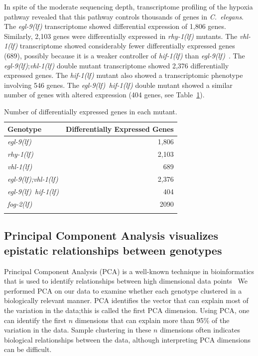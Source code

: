 \documentclass[10pt, onecolumn]{article}
\newcommand{\cel}{\emph{C.~elegans}}
\newcommand{\fog}{\emph{\mbox{fog-2(lf)}}}
\newcommand{\egl}{\emph{\mbox{egl-9}(lf)}}
\newcommand{\rhy}{\emph{\mbox{rhy-1}(lf)}}
\newcommand{\vhl}{\emph{\mbox{vhl-1}(lf)}}
\newcommand{\eglvhl}{\emph{\mbox{egl-9(lf);vhl-1(lf)}}}
\newcommand{\eglhif}{\emph{\mbox{egl-9(lf)}~\mbox{hif-1(lf)}}}
\newcommand{\hif}{\emph{\mbox{hif-1(lf)}}}
\newcommand{\egln}{1,806}
\newcommand{\rhyn}{2,103}
\newcommand{\vhln}{689}
\newcommand{\eglvhln}{2,376}
\newcommand{\hifn}{546}
\newcommand{\eglhifn}{404}
\newcommand{\fogn}{2090}
\begin{document}
In spite of the moderate sequencing depth, transcriptome profiling of the hypoxia
pathway revealed that this pathway controls thousands of genes in \cel{}. The
\egl{} transcriptome showed differential expression of \egln{} genes. Similarly,
\rhyn{} genes were differentially expressed in \rhy{} mutants. The \vhl{}
transcriptome showed considerably fewer differentially expressed genes (\vhln{}),
possibly because it is a weaker controller of \hif{} than
\egl{}~\cite{Shao2009}. The \egl{};\vhl{} double mutant transcriptome showed
\eglvhln{} differentially expressed genes. The \hif{} mutant also showed a
transcriptomic phenotype involving \hifn{} genes. The \eglhif{} double mutant
showed a similar number of genes with altered expression (\eglhifn{} genes, see
Table~\ref{tab:genes}).

\begin{table}[tbhp]
  \centering
  \begin{tabular}{lr}
    \toprule{}
    Genotype & Differentially Expressed Genes \\
    \midrule{}
    \egl{} & \egln{}\\
    \rhy{} & \rhyn{}\\
    \vhl{} & \vhln{}\\
    \eglvhl{} & \eglvhln{}\\
    \eglhif{} & \eglhifn{}\\
    \fog{} & \fogn{}\\
    \bottomrule{}
  \end{tabular}
  \caption{Number of differentially expressed genes in each mutant.}
\label{tab:genes}
\end{table}

\subsection*{Principal Component Analysis visualizes epistatic relationships between genotypes}
\label{sub:Clustering}

Principal Component Analysis (PCA) is a well-known technique in bioinformatics that is
used to identify relationships between high dimensional data points~\cite{Yeung2001}
We performed PCA on our data to examine whether each genotype clustered in a biologically
relevant manner. PCA identifies the vector that can explain most of the variation
in the data;this is called the first PCA dimension. Using PCA, one can identify
the first $n$ dimensions that can explain more than 95\% of the variation in the
data. Sample clustering in these $n$ dimensions often indicates biological
relationships between the data, although interpreting PCA dimensions can be
difficult.
\end{document}
